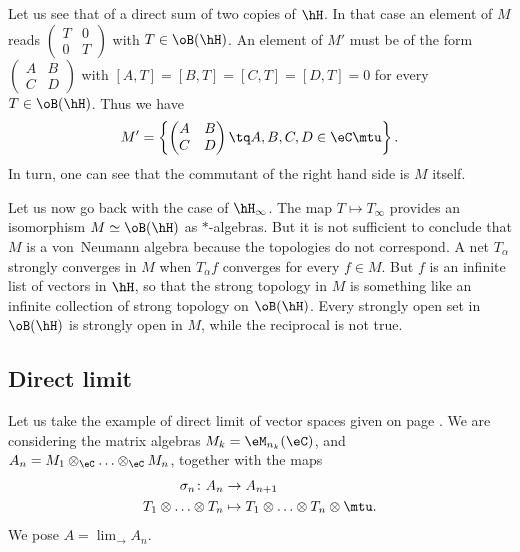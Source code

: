 Let us see that of a direct sum of two copies of $\hH$. In that case an element of $M$ reads
$\begin{pmatrix}
		T & 0 \\
		0 & T
	\end{pmatrix}$ with $T\in\oB(\hH)$. An element of $M'$ must be of the form
$\begin{pmatrix}
		A & B \\
		C & D
	\end{pmatrix}$ with $[A,T]=[B,T]=[C,T]=[D,T]=0$ for every $T\in\oB(\hH)$. Thus we have
\begin{equation}
	M'=\left\{ \begin{pmatrix}
		A & B \\
		C & D
	\end{pmatrix}\tq A,B,C,D\in\eC\mtu \right\}.
\end{equation}
In turn, one can see that the commutant of the right hand side is $M$ itself.

Let us now go back with the case of $\hH_{\infty}$. The map $T\mapsto T_{\infty}$ provides an isomorphism $M\simeq\oB(\hH)$ as $*$-algebras. But it is not sufficient to conclude that $M$ is a von~Neumann algebra because the topologies do not correspond. A net $T_{\alpha}$ strongly converges in $M$ when $T_{\alpha}f$ converges for every $f\in M$. But $f$ is an infinite list of vectors in $\hH$, so that the strong topology in $M$ is something like an infinite collection of strong topology on $\oB(\hH)$. Every strongly open set in $\oB(\hH)$ is strongly open in $M$, while the reciprocal is not true.

\subsection{Direct limit}

Let us take the example of direct limit of vector spaces given on page \pageref{PgExDirectLimVS}. We are considering the matrix algebras $M_k=\eM_{n_k}(\eC)$, and $A_n=M_1\otimes_{\eC}\ldots\otimes_{\eC} M_n$, together with the maps
\begin{equation}
	\begin{aligned}
		\sigma_n\colon A_n          & \to A_{n+1}                                       \\
		T_1\otimes\ldots\otimes T_n & \mapsto T_1\otimes \ldots\otimes T_n\otimes \mtu.
	\end{aligned}
\end{equation}
We pose $A=\lim_{\rightarrow}A_n$.

